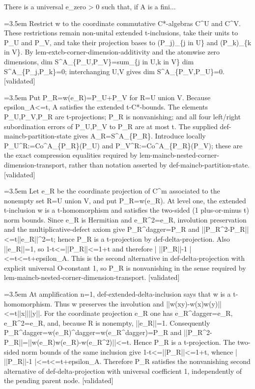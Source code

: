 \documentclass{article}
\newcommand{\step}[1]{\par\noindent\hangindent=3.5em\hangafter=1%
  \makebox[3.5em][l]{\textbf{#1.}}}
\newcommand{\steptag}[1]{\hfill{\small\textsf{[#1]}}}
\begin{document}
\begin{proofbox}{There is a universal e\_zero > 0 such that, if A is a fini...}
\step{1.3} Restrict w to the coordinate commutative C*-algebras C\textasciicircum{}U and C\textasciicircum{}V. These restrictions remain non-unital extended t-inclusions, take their units to P\_U and P\_V, and take their projection bases to (P\_j)\_\{j in U\} and (P\_k)\_\{k in V\}. By lem-extcb-corner-dimension-additivity and the atomwise zero dimensions, dim S\textasciicircum{}A\_\{P\_U,P\_V\}=sum\_\{j in U,k in V\} dim S\textasciicircum{}A\_\{P\_j,P\_k\}=0; interchanging U,V gives dim S\textasciicircum{}A\_\{P\_V,P\_U\}=0. \steptag{validated} \\[4pt]
\step{1.4} Put P\_R=w(e\_R)=P\_U+P\_V for R=U union V. Because epsilon\_A<=t, A satisfies the extended t-C*-bounds. The elements P\_U,P\_V,P\_R are t-projections; P\_R is nonvanishing; and all four left/right subordination errors of P\_U,P\_V to P\_R are at most t. The supplied def-maincb-partition-state gives A\_R=S\textasciicircum{}A\_\{P\_R\}. Introduce locally P\_U\textasciicircum{}R:=Co\textasciicircum{}A\_\{P\_R\}(P\_U) and P\_V\textasciicircum{}R:=Co\textasciicircum{}A\_\{P\_R\}(P\_V); these are the exact compression equalities required by lem-maincb-nested-corner-dimension-transport, rather than notation asserted by def-maincb-partition-state. \steptag{validated} \\[6pt]
\step{1.4.1} Let e\_R be the coordinate projection of C\textasciicircum{}m associated to the nonempty set R=U union V, and put P\_R=w(e\_R). At level one, the extended t-inclusion w is a t-homomorphism and satisfies the two-sided (1 plus-or-minus t) norm bounds. Since e\_R is Hermitian and e\_R\textasciicircum{}2=e\_R, involution preservation and the multiplicative-defect axiom give P\_R\textasciicircum{}dagger=P\_R and ||P\_R\textasciicircum{}2-P\_R||<=t||e\_R||\textasciicircum{}2=t; hence P\_R is a t-projection by def-delta-projection. Also ||e\_R||=1, so 1-t<=||P\_R||<=1+t and therefore | ||P\_R||-1 |<=t<=t+epsilon\_A. This is the second alternative in def-delta-projection with explicit universal O-constant 1, so P\_R is nonvanishing in the sense required by lem-maincb-nested-corner-dimension-transport. \steptag{validated} \\[6pt]
\step{1.4.1.1} At amplification n=1, def-extended-delta-inclusion says that w is a t-homomorphism. Thus w preserves the involution and ||w(xy)-w(x)w(y)||<=t||x||||y||. For the coordinate projection e\_R one has e\_R\textasciicircum{}dagger=e\_R, e\_R\textasciicircum{}2=e\_R, and, because R is nonempty, ||e\_R||=1. Consequently P\_R\textasciicircum{}dagger=w(e\_R)\textasciicircum{}dagger=w(e\_R\textasciicircum{}dagger)=P\_R and ||P\_R\textasciicircum{}2-P\_R||=||w(e\_R)w(e\_R)-w(e\_R\textasciicircum{}2)||<=t. Hence P\_R is a t-projection. The two-sided norm bounds of the same inclusion give 1-t<=||P\_R||<=1+t, whence | ||P\_R||-1 |<=t<=t+epsilon\_A. Therefore P\_R satisfies the nonvanishing second alternative of def-delta-projection with universal coefficient 1, independently of the pending parent node. \steptag{validated} \\[4pt]

\end{proofbox}
\end{document}
